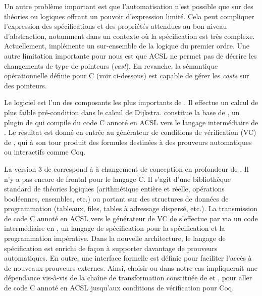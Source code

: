 Un autre problème important est que l'automatisation n'est possible que sur
des théories ou logiques offrant un pouvoir d'expression limité.
Cela peut compliquer l'expression des spécifications et des propriétés
attendues au bon niveau d'abstraction,
notamment dans un contexte où la spécification est très complexe.
Actuellement, \framac implémente un sur-ensemble de la logique du premier ordre.
Une autre limitation importante pour nous est que ACSL ne permet
pas de décrire les changements de type de pointeurs (\emph{cast}).
En revanche, la sémantique opérationnelle définie pour \compcert C
(voir ci-dessous) est capable de gérer les \emph{casts} sur des pointeurs.

Le logiciel \why est l'un des composants les plus importants de \framac.
Il effectue un calcul de plus faible pré-condition dans le calcul de Dijkstra.
\why constitue la base de \jessie, un plugin de \framac qui compile du
code C annoté en ACSL vers le langage intermédiaire de \jessie.
Le résultat est donné en entrée au générateur 
de conditions de vérification (VC) de \why,
qui à son tour produit des formules destinées à des prouveurs
automatiques ou interactifs comme Coq.

La version 3 de \why correspond à à changement de conception en profondeur
de \why.
Il n'y a pas encore de frontal pour le langage C.
Il s'agit d'une bibliothèque standard de théories logiques
(arithmétique entière et réelle, opérations booléennes, ensembles, etc.)
ou portant sur des structures de données de programmation (tableaux,
files, tables à adressage dispersé, etc.). 
La transmission de code C annoté en ACSL vers le générateur de VC
de  s'effectue par \jessie via un code intermédiaire
en \whyML, un langage de spécification pour la spécification
et la programmation impérative.
Dans la nouvelle architecture, le langage de spécification est enrichi
de façon à supporter davantage de prouveurs automatiques.
En outre, une interface formelle est définie pour faciliter
l'accès à de nouveaux prouveurs externes. 
Ainsi, choisir \why ou  dans notre cas impliquerait
une dépendance vis-à-vis de la chaîne de transformation constituée de
\jessie et \why, pour aller de code C annoté en ACSL jusqu'aux 
conditions de vérification pour Coq.

